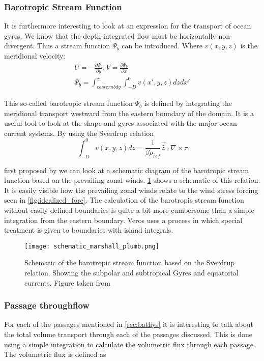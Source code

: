 \begin{multicols}{2}
\subsubsection{Barotropic Stream Function} \label{sec:BSF_theory}
It is furthermore interesting to look at an expression for the transport of ocean gyres. We know that the depth-integrated flow must be horizontally non-divergent. Thus a stream function $\Psi_{b}$ can be introduced. Where $v(x,y,z)$ is the meridional velocity:
\begin{align}
U = -\frac{\partial \Psi_{b}}{\partial y}; V=\frac{\partial \Psi_{b}}{\partial x} \\
\Psi_{b} = \int_{eastern bdy}^{x} \int_{-D}^{0} v(x',y,z) dz dx'
\end{align}

This so-called barotropic stream function $\Psi_{b}$ is defined by integrating the meridional transport westward from the eastern boundary of the domain. It is a useful tool to look at the shape and gyres associated with the major ocean current systems. By using the Sverdrup relation
$$
\int_{-D}^{0}v(x,y,z) dz = \frac{1}{\beta \rho_{ref}}\vec{\hat{z}}\cdot \nabla \times \tau
$$

first proposed by \cite{sverdrup1947wind} we can look at a schematic diagram of the barotropic stream function based on the prevailing zonal winds. \cref{fig:schem_currents} shows a schematic of this relation. It is easily visible how the prevailing zonal winds relate to the wind stress forcing seen in \cref{fig:idealized_forc}. The calculation of the barotropic stream function without easily defined boundaries is quite a bit more cumbersome than a simple integration from the eastern boundary. Veros uses a process in which special treatment is given to boundaries with island integrals. 
 
  \begin{figure}[H]
 	\texttt{[image: schematic\_marshall\_plumb.png]}
 	\caption{Schematic of the barotropic stream function based on the Sverdrup relation. Showing the subpolar and subtropical Gyres and equatorial currents. Figure taken from \cite{MarschallPlumb}}
 	\label{fig:schem_currents}
 \end{figure}
\subsubsection{Passage throughflow}\label{sec:throughflowp}
For each of the passages mentioned in \cref{sec:bathys} it is interesting to talk about the total volume transport through each of the passages discussed. This is done using a simple integration to calculate the volumetric flux through each passage. The volumetric flux is defined as


\end{multicols}
